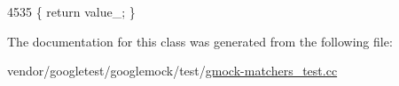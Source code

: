 \begin{DoxyCode}
4535 \{ \textcolor{keywordflow}{return} value\_; \}
\end{DoxyCode}


The documentation for this class was generated from the following file\+:\begin{DoxyCompactItemize}
\item 
vendor/googletest/googlemock/test/\hyperlink{gmock-matchers__test_8cc}{gmock-\/matchers\+\_\+test.\+cc}\end{DoxyCompactItemize}
